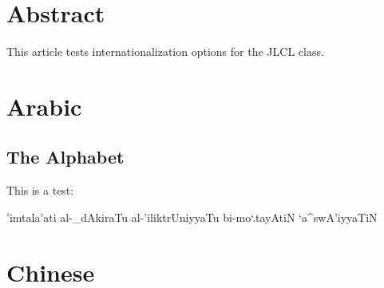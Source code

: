 \documentclass{jlcl}
\title{\articletitle}
\author{AUTHOR NAME\\
AUTHOR INSTITUTION\\
\texttt{AUTHOR EMAIL} \and
AUTHOR 2 NAME\\
AUTHOR 2 INSTITUTION\\
 \texttt{AUTHOR 2 EMAIL}}
\begin{document}
\setarab %
\vocalize %
\transtrue %


\setcounter{page}{1}
\thispagestyle{firstpage}

\authordata




\section*{Abstract}
This article tests internationalization options for the JLCL class.



\section{Arabic}

\subsection{The Alphabet}


This is a test: 

\begin{RLtext}'imtala'ati al-_dAkiraTu al-'iliktrUniyyaTu bi-mo`.tayAtiN `a^swA'iyyaTiN\end{RLtext}


\section{Chinese}
\end{document}
